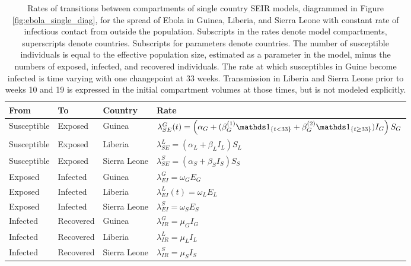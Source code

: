 \begin{table}[htbp]
	\caption[Transmission rates for single country SEIR models for Ebola in West Africa.]{Rates of transitions between compartments of single country SEIR models, diagrammed in Figure \ref{fig:ebola_single_diag}, for the spread of Ebola in Guinea, Liberia, and Sierra Leone with constant rate of infectious contact from outside the population. Subscripts in the rates denote model compartments, superscripts denote countries. Subscripts for parameters denote countries. The number of susceptible individuals is equal to the effective population size, estimated as a parameter in the model, minus the numbers of exposed, infected, and recovered individuals. The rate at which susceptibles in Guine become infected is time varying with one changepoint at 33 weeks. Transmission in Liberia and Sierra Leone prior to weeks 10 and 19 is expressed in the initial compartment volumes at those times, but is not modeled explicitly.}
	\label{tab:ebola_rates_single}
	\centering\footnotesize
	\begin{tabular}{llll}
		\hline
		\textbf{From} & \textbf{To} & \textbf{Country} & \textbf{Rate} \\
		\hline
		Susceptible & Exposed & Guinea & $ \lambda_{SE}^G(t) = \left (\alpha_G + (\beta_G^{(1)} \ind{t<33} + \beta_G^{(2)}\ind{t\geq33})I_G\right )S_G $ \\
		Susceptible & Exposed & Liberia & $ \lambda_{SE}^L = \left (\alpha_L + \beta_LI_L\right )S_L $\\
		Susceptible & Exposed & Sierra Leone & $ \lambda_{SE}^S = \left (\alpha_S + \beta_SI_S\right )S_S $ \\
		Exposed & Infected & Guinea & $ \lambda_{EI}^G = \omega_GE_G $\\
		Exposed & Infected & Liberia & $ \lambda_{EI}^L(t) = \omega_LE_L $ \\
		Exposed & Infected & Sierra Leone & $\lambda_{EI}^S = \omega_SE_S$ \\
		Infected & Recovered & Guinea & $ \lambda_{IR}^G = \mu_GI_G $ \\
		Infected & Recovered & Liberia & $ \lambda_{IR}^L = \mu_LI_L $ \\	
		Infected & Recovered & Sierra Leone & $ \lambda_{IR}^S = \mu_SI_S$ \\
		\hline
	\end{tabular}
\end{table}

